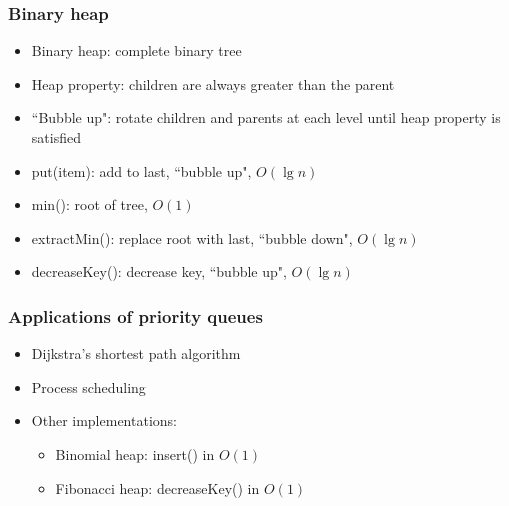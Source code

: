 \documentclass{beamer}
\begin{document}
\begin{frame}
 \frametitle{Binary heap}
 \begin{center}
  \scalebox{0.6} {
  }
 \end{center}
 \begin{itemize}
  \item Binary heap: complete binary tree
  \item Heap property: children are always greater than the parent
  \item ``Bubble up": rotate children and parents at each level until
        heap property is satisfied
  \item put(item): add to last, ``bubble up", $O(\lg n)$
  \item min(): root of tree, $O(1)$
  \item extractMin(): replace root with last, ``bubble down", $O(\lg n)$
  \item decreaseKey(): decrease key, ``bubble up", $O(\lg n)$
 \end{itemize}
\end{frame}

\begin{frame}
 \frametitle{Applications of priority queues}
 \begin{itemize}
  \item Dijkstra's shortest path algorithm
  \item Process scheduling
  \item Other implementations:
  \begin{itemize}
   \item Binomial heap: insert() in $O(1)$
   \item Fibonacci heap: decreaseKey() in $O(1)$
  \end{itemize}
 \end{itemize}
\end{frame}
\end{document}
